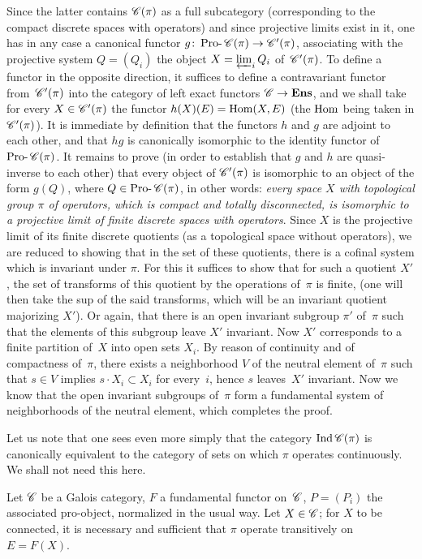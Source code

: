 Since the latter contains $\cal{C}(\pi)$ as a
full subcategory (corresponding to the compact discrete spaces with
operators) and since projective limits
exist in it, one has in any case a canonical functor $g\colon
\Prodash\cal{C}(\pi) \to \cal{C}'(\pi)$, associating with the projective system
$Q=(Q_i)$
the object $X=\varprojlim_{i} Q_i$ of~$\cal{C}'(\pi)$. To define
a functor in the opposite direction, it suffices to define a contravariant
functor from~$\cal{C}'(\pi)$ into the category of left exact functors
$\cal{C}\to \Ens$, and we shall take for every
$X\in\cal{C}'(\pi)$ the functor $h(X)(E)= \operatorname{Hom}(X, E)$
(the $\operatorname{Hom}$ being taken in $\cal{C}'(\pi)$). It is immediate
by definition that the functors $h$ and $g$ are adjoint to each
other, and that $hg$ is canonically isomorphic to the identity functor
of~$\Prodash\cal{C}(\pi)$. It remains to prove (in order to establish
that $g$ and $h$ are quasi-inverse to each other) that every object of
$\cal{C}'(\pi)$ is isomorphic to an object of the form $g(Q)$,
where $Q\in\Prodash{\cal C}(\pi)$, in other words: \emph{every
space $X$ with topological group $\pi$ of operators, which is
compact and totally disconnected, is isomorphic to a projective
limit of finite discrete spaces with operators}. Since $X$
is the projective limit of its finite discrete quotients (as a
topological space without operators), we are reduced to
showing that in the set of these quotients, there is a
cofinal system which is invariant under $\pi$. For this it suffices to show
that for such a quotient $X'$, the set of transforms of this
quotient by the operations of~$\pi$ is finite, (one will then take
the sup of the said transforms, which will be an invariant quotient
majorizing $X'$). Or again, that there is an open invariant subgroup
$\pi'$ of~$\pi$ such that the elements of this subgroup
leave $X'$ invariant. Now $X'$ corresponds to a finite partition of~$X$ into
open sets $X_i$. By reason of continuity and of
compactness of~$\pi$, there exists a neighborhood $V$ of
the neutral element of~$\pi$ such that $s\in V$ implies
$s\cdot X_i\subset X_i$ for every~$i$, hence $s$ leaves~$X'$ invariant. Now we know
that the open invariant subgroups of~$\pi$ form a
fundamental system of neighborhoods of the neutral element, which
completes the proof.

Let us note that one sees even more simply that the category
$\Ind \cal{C}(\pi)$ is canonically equivalent to the
category of sets on which $\pi$ operates
continuously. We shall not need this here.

\begin{proposition}
\label{V.5.3}
Let $\cal{C}$ be a Galois category, $F$ a fundamental
functor
on~$\cal{C}$,
$P=(P_i)$ the associated pro-object, normalized in the usual
way. Let
$X\in\cal{C}$;
for $X$ to be connected, it is necessary and sufficient that $\pi$ operate
transitively on~$E=F(X)$.
\end{proposition}

